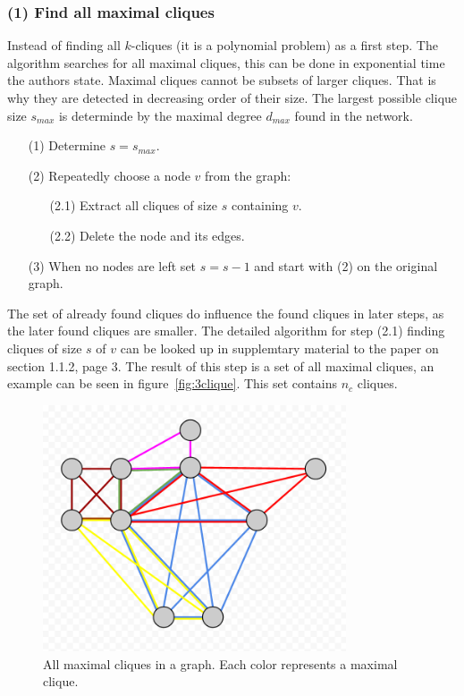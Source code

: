 \documentclass[runningheads,a4paper]{llncs}
\begin{document}
\subsubsection{(1) Find all maximal cliques}
Instead of finding all $k$-cliques (it is a polynomial problem) as a first step.
The algorithm searches for all maximal cliques, this can be done in exponential time the authors state.
Maximal cliques cannot be subsets of larger cliques.
That is why they are detected in decreasing order of their size.
The largest possible clique size $s_{max}$ is determinde by the maximal degree $d_{max}$ found in the network.

\begin{enumerate}
\small
\item[(1)] Determine $s=s_{max}$.
\item[(2)] Repeatedly choose a node $v$ from the graph:
	\begin{enumerate}
		\item[(2.1)] Extract all cliques of size $s$ containing $v$.
		\item[(2.2)] Delete the node and its edges.
	\end{enumerate}
\item[(3)] When no nodes are left set $s=s-1$ and start with (2) on the original graph.
\end{enumerate}

The set of already found cliques do influence the found cliques in later steps, as the later found cliques are smaller.
The detailed algorithm for step (2.1) finding cliques of size $s$ of $v$ can be looked up in supplemtary material to the paper on section 1.1.2, page 3.
The result of this step is a set of all maximal cliques, an example can be seen in figure~\ref{fig:3clique}.
This set contains $n_c$ cliques.

\begin{figure}
\begin{center}
	\includegraphics[width=0.8\textwidth]{allmaxcliques.png}
		\caption{All maximal cliques in a graph. Each color represents a maximal clique.}
		\label{fig:allmaxcliques}
\end{center}
\end{figure}
\end{document}
